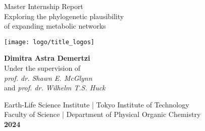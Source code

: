 \begin{titlepage}\label{sec:title}
    \begin{center}
    \thispagestyle{empty}
    
    \Large
    Master Internship Report\\
    \vspace{0.2cm}
    \huge{Exploring the phylogenetic plausibility\\of expanding metabolic networks}
    

    \texttt{[image: logo/title\_logos]}

    
    \vspace{0.8cm}
    \large\textbf{Dimitra Astra Demertzi}\\
    \vspace{0.2cm}
    \large Under the supervision of\\ \emph{prof. dr. Shawn E. McGlynn}\\ and \emph{prof. dr. Wilhelm T.S. Huck}
    \vspace{3cm}
    

    \normalsize
    Earth-Life Science Institute | Tokyo Institute of Technology
    \\
    Faculty of Science | Department of Physical Organic Chemistry
    \\
    \normalsize\textbf{2024}
    
    \vfill
    \end{center}
    \end{titlepage}